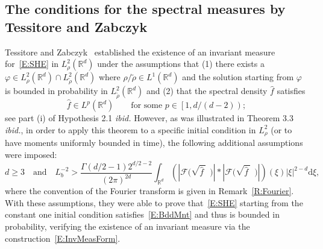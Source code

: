\documentclass[a4paper,11pt]{article}%
\theoremstyle{plain}
\theoremstyle{definition}
\numberwithin{equation}{section}
\newcommand{\R}{\mathbb{R}}
\newcommand{\ud}{\ensuremath{\mathrm{d}}}
\begin{document}
\subsection{The conditions for the spectral measures by Tessitore and Zabczyk}\label{SS:TessZabz}

Tessitore and Zabczyk~\cite{tessitore.zabczyk:98:invariant} established the existence of an
invariant measure for~\eqref{E:SHE} in $L^2_{\rho}(\R^d)$ under the assumptions that (1) there
exists a $\varphi \in L^2_{\rho}(\R^d) \cap L^2_{\widetilde\rho}(\R^d)$ where $\rho/\widetilde\rho
\in L^1 (\R^d)$ and the solution starting from $\varphi$ is bounded in probability in
$L^2_{\widetilde \rho}(\R^d)$ and (2) that the spectral density $\hat{f}$ satisfies
\begin{equation}\label{E:CorTZ}
\widehat{f} \in L^p (\R^d) \qquad \text{for some $p \in \left[1, d/(d-2)\right)$};
\end{equation}
see part (i) of Hypothesis 2.1 \textit{ibid.} However, as was illustrated in Theorem 3.3
\textit{ibid.}, in order to apply this theorem to a specific initial condition in $L^2_{\rho}$ (or
to have moments uniformly bounded in time), the following additional assumptions were imposed:
\begin{equation}\label{E:TZspec}
  d\ge 3 \quad \text{and} \quad
  L_b^{-2}> \frac{\Gamma(d/2 -1)2^{d/2-2}}{(2\pi)^{2d}} \int_{\R^d} \left(\left| \mathcal{F}\big(\sqrt{\widehat{f}\:}\:\:\big) \right| * \left| \mathcal{F}\big(\sqrt{\widehat{f}\:}\:\:\big)\right|\right) (\xi) |\xi|^{2-d} \ud \xi ,
\end{equation}
where the convention of the Fourier transform is given in Remark~\ref{R:Fourier}. With these
assumptions, they were able to prove that~\eqref{E:SHE} starting from the constant one initial
condition satisfies~\eqref{E:BddMnt} and thus is bounded in probability, verifying the existence of
an invariant measure via the construction~\eqref{E:InvMeasForm}.

\end{document}
